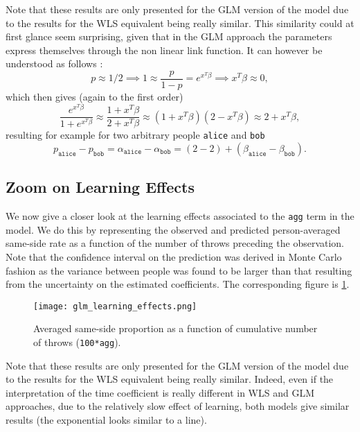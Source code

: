 \documentclass[a4paper, 12pt,oneside]{article}
\begin{document}
			Note that these results are only presented for the GLM version of the model due to the results for the WLS equivalent being really similar. This similarity could at first glance seem surprising, given that in the GLM approach the parameters express themselves through the non linear link function. It can however be understood as follows :
			\begin{equation*}
				p\approx 1/2 \implies 1 \approx \frac{p}{1-p} 
										= e^{x^T \beta} \implies x^T\beta\approx 0,
			\end{equation*}
			which then gives (again to the first order)
			\begin{equation*}
				\frac{e^{x^T\beta}}{1+e^{x^T\beta}}\approx \frac{1+x^T\beta}{2+x^T\beta}
									\approx (1+x^T\beta)(2-x^T\beta) \approx 2 + x^T\beta,
			\end{equation*}
			resulting for example for two arbitrary people \texttt{alice} and \texttt{bob} 
			\begin{equation*}			
				p_{\texttt{alice}}-p_{\texttt{bob}}=\alpha_{\texttt{alice}} - \alpha_{\texttt{bob}}=(2-2)+(\beta_{\texttt{alice}} - \beta_{\texttt{bob}}).
			\end{equation*}
		\subsection{Zoom on Learning Effects}
			We now give a closer look at the learning effects associated to the \texttt{agg} term in the model. We do this by representing the observed and predicted person-averaged same-side rate as a function of the number of throws preceding the observation.  Note that the confidence interval on the prediction was derived in Monte Carlo fashion as the variance between people was found to be larger than that resulting from the uncertainty on the estimated coefficients. 
			The corresponding figure is \ref{fig:learning-effects}.
			\begin{figure}[htb]
				\centering
				\texttt{[image: glm\_learning\_effects.png]}
				\caption{Averaged same-side proportion as a function of cumulative number of throws (\texttt{100*agg}).}
				\label{fig:learning-effects}
			\end{figure}
			
			Note that these results are only presented for the GLM version of the model due to the results for the WLS equivalent being really similar. Indeed, even if the interpretation of the time coefficient is really different in WLS and GLM approaches, due to the relatively slow effect of learning, both models give similar results (the exponential looks similar to a line).    
\end{document}
